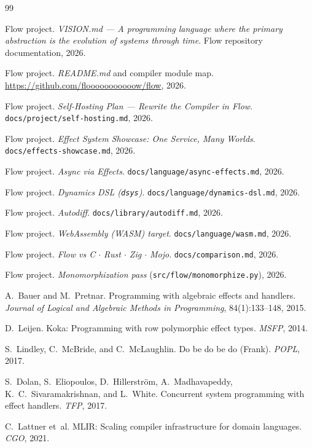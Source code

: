 \documentclass[11pt,a4paper]{article}
\theoremstyle{remark}
\begin{document}
\begin{thebibliography}{99}

Flow project.
\textit{VISION.md --- A programming language where the primary abstraction is
the evolution of systems through time}.
Flow repository documentation, 2026.

Flow project.
\textit{README.md} and compiler module map.
\url{https://github.com/flooooooooooow/flow}, 2026.

Flow project.
\textit{Self-Hosting Plan --- Rewrite the Compiler in Flow}.
\texttt{docs/project/self-hosting.md}, 2026.

Flow project.
\textit{Effect System Showcase: One Service, Many Worlds}.
\texttt{docs/effects-showcase.md}, 2026.

Flow project.
\textit{Async via Effects}.
\texttt{docs/language/async-effects.md}, 2026.

Flow project.
\textit{Dynamics DSL (\texttt{dsys})}.
\texttt{docs/language/dynamics-dsl.md}, 2026.

Flow project.
\textit{Autodiff}.
\texttt{docs/library/autodiff.md}, 2026.

Flow project.
\textit{WebAssembly (WASM) target}.
\texttt{docs/language/wasm.md}, 2026.

Flow project.
\textit{Flow vs C $\cdot$ Rust $\cdot$ Zig $\cdot$ Mojo}.
\texttt{docs/comparison.md}, 2026.

Flow project.
\textit{Monomorphization pass} (\texttt{src/flow/monomorphize.py}), 2026.

A.~Bauer and M.~Pretnar.
Programming with algebraic effects and handlers.
\textit{Journal of Logical and Algebraic Methods in Programming}, 84(1):133--148, 2015.

D.~Leijen.
Koka: Programming with row polymorphic effect types.
\textit{MSFP}, 2014.

S.~Lindley, C.~McBride, and C.~McLaughlin.
Do be do be do (Frank).
\textit{POPL}, 2017.

S.~Dolan, S.~Eliopoulos, D.~Hillerstr{\"o}m, A.~Madhavapeddy, K.~C.~Sivaramakrishnan, and L.~White.
Concurrent system programming with effect handlers.
\textit{TFP}, 2017.

C.~Lattner et~al.
MLIR: Scaling compiler infrastructure for domain languages.
\textit{CGO}, 2021.

\end{thebibliography}
\end{document}

